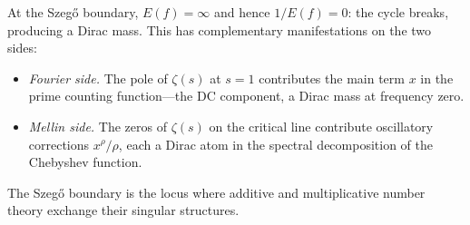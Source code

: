 \begin{remark}
At the Szeg\H{o} boundary, $E(f) = \infty$ and hence $1/E(f) = 0$: the cycle breaks, producing a Dirac mass. This has complementary manifestations on the two sides:
\begin{itemize}
\item \emph{Fourier side.} The pole of $\zeta(s)$ at $s = 1$ contributes the main term $x$ in the prime counting function---the DC component, a Dirac mass at frequency zero.
\item \emph{Mellin side.} The zeros of $\zeta(s)$ on the critical line contribute oscillatory corrections $x^\rho / \rho$, each a Dirac atom in the spectral decomposition of the Chebyshev function.
\end{itemize}
The Szeg\H{o} boundary is the locus where additive and multiplicative number theory exchange their singular structures.
\end{remark}

